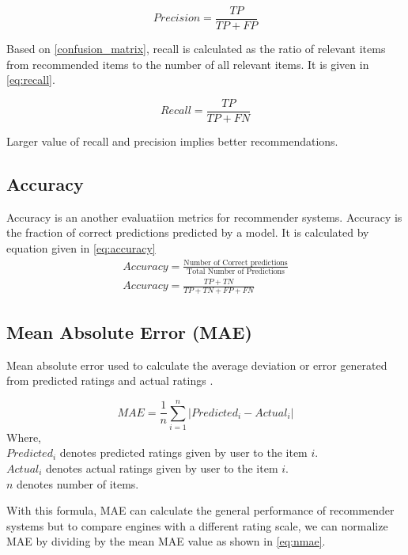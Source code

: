 \begin{equation}
Precision = \frac{TP}{TP + FP} 
\label{eq:precision}
\end{equation}

\noindent Based on \autoref{confusion_matrix}, recall is calculated as the ratio of relevant items from recommended items to the number of all relevant items. It is given in \autoref{eq:recall}. 

\begin{equation}
Recall = \frac{TP}{TP + FN} 
\label{eq:recall}
\end{equation}

Larger value of recall and precision implies better recommendations.

\subsection{Accuracy}
Accuracy is an another evaluatiion metrics for recommender systems. Accuracy is the fraction of correct predictions predicted by a model. It is calculated by equation given in \autoref{eq:accuracy}
\begin{align}
Accuracy = \frac{\textrm{Number of Correct predictions}}{\textrm{Total Number of Predictions}} \\
Accuracy = \frac{TP + TN }{TP + TN + FP + FN}
\label{eq:accuracy}
\end{align}

\subsection{Mean Absolute Error (MAE)}
Mean absolute error used to calculate the average deviation or error generated from predicted ratings and actual ratings \cite{26}.

\begin{equation}
MAE = \frac{1}{n} \sum_{i=1}^{n}{\vert{Predicted_i - Actual_i} \vert}
\label{eq:mae}
\end{equation}
\noindent Where, \\ 
$Predicted_i$ \textsf{ denotes predicted ratings given by user to the item} $i.$ \\
$Actual_i$ \textsf{ denotes actual ratings given by user to the item } $i.$ \\
$n$ \textsf{denotes number of items.}

\noindent With this formula, MAE can calculate the general performance of recommender systems but to compare engines with a different rating scale, we can normalize MAE by dividing by the mean MAE value as shown in \autoref{eq:nmae}. 

